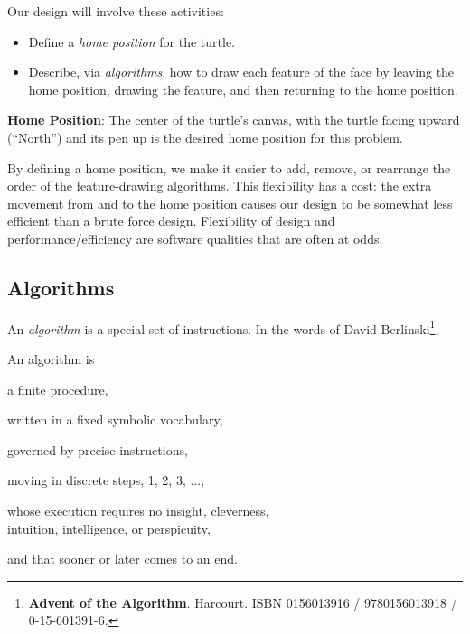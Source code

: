 \documentclass[pdftex,12pt]{artikel3}
\begin{document}
Our design will involve these activities:
\begin{itemize}
\item
Define a \emph{home position} for the turtle.
\item
Describe, via \emph{algorithms}, 
how to draw each feature of the face by leaving the home position, 
drawing the feature, and then returning to the home position.
\end{itemize}

{\bf Home Position}: The center of the turtle's canvas, with the turtle facing upward (“North”)
and its pen up is the desired home position for this problem.

By defining a home position, we make it easier to add, remove, or 
rearrange the order of the feature-drawing algorithms.
This flexibility has a cost:
the extra movement from and to the home position causes
our design to be somewhat less efficient than a brute force design.
Flexibility of design and performance/efficiency are software qualities 
that are often at odds.


\subsection{Algorithms}

An \emph{algorithm} is a special set of instructions.
In the words of David Berlinski\footnote{{\bf Advent of the Algorithm}.
Harcourt. ISBN 0156013916 / 9780156013918 / 0-15-601391-6.},
\begin{center}
\begin{tt}
An algorithm is

a finite procedure,

written in a fixed symbolic vocabulary,

governed by precise instructions,

moving in discrete steps, 1, 2, 3, ...,

whose execution requires no insight, cleverness, \\

intuition, intelligence, or perspicuity,

and that sooner or later comes to an end.
\end{tt}
\end{center}
\end{document}
